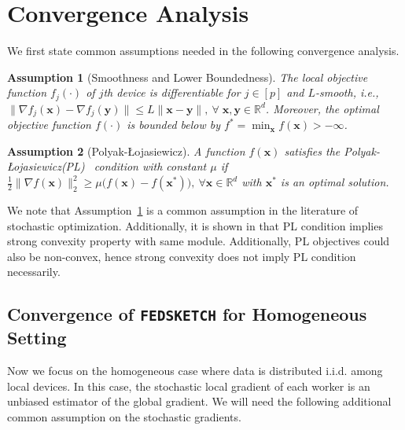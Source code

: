 \documentclass[twoside]{article}
\newcommand{\pl}{Polyak-\L{}ojasiewicz}
\newtheorem{assumption}{Assumption}
\begin{document}
\section{Convergence Analysis}\label{sec:cnvg-an}
\vspace{-0.05in}

We first state common assumptions needed in the following convergence analysis.
\begin{assumption}[Smoothness and Lower Boundedness]\label{Assu:1}
The local objective function $f_j(\cdot)$ of $j$th device is differentiable for $j\in [p]$ and $L$-smooth, i.e., $\|\nabla f_j(\boldsymbol{x})-\nabla f_j(\mathbf{y})\|\leq L\|\boldsymbol{x}-\mathbf{y}\|,\: \forall \;\boldsymbol{x},\mathbf{y}\in\mathbb{R}^d$. Moreover, the optimal objective function $f(\cdot)$ is bounded below by ${f^*} = \min_{\boldsymbol{x}} f(\boldsymbol{x})>-\infty$. 
\end{assumption}

\begin{assumption}[\pl]\label{assum:pl}
A function $f(\boldsymbol{x})$ satisfies the \pl (PL)~ condition with constant $\mu$ if $\frac{1}{2}\|\nabla f(\boldsymbol{x})\|_2^2\geq \mu\big(f(\boldsymbol{x})-f(\boldsymbol{x}^*)\big),\: \forall \boldsymbol{x}\in\mathbb{R}^d $ with $\boldsymbol{x}^*$ is an optimal solution.
\end{assumption}

We note that Assumption~\ref{Assu:1} is a common assumption in the literature of stochastic optimization. Additionally, it is shown in \cite{karimi2016linear} that PL condition implies strong convexity property with same module. Additionally, PL objectives could also be non-convex, hence strong convexity does not imply PL condition necessarily.  

\vspace{-0.05in}
\subsection{Convergence of  \texttt{FEDSKETCH} for Homogeneous Setting} 
\vspace{-0.05in}

Now we focus on the homogeneous case where data is distributed i.i.d. among local devices. In this case, the stochastic local gradient of each worker is an unbiased estimator of the global gradient. We will need the following additional common assumption on the stochastic gradients.
\end{document}
